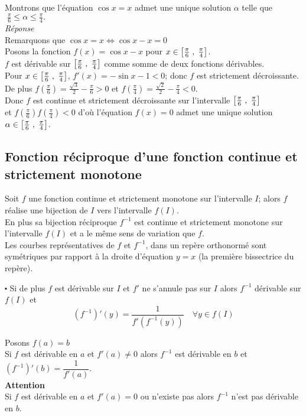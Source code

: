\begin{example}
Montrons  que l'équation $ \cos x= x $ admet une unique solution $ \alpha$ telle que    $\; \frac{\pi}{6} \leq \alpha \leq\frac{\pi}{4}.$ \\
\emph{Réponse}\\
Remarquons que  $ \cos x= x  \Leftrightarrow \cos x- x=0$\\
Posons la fonction $ f(x)= \cos x- x$ pour $ x\in \left[\frac{\pi}{6}\;,\; \frac{\pi}{4}\right] $.\\
$ f $ est dérivable sur $\left[\frac{\pi}{6}\;,\; \frac{\pi}{4}\right] $ comme somme de deux fonctions dérivables. \\
Pour $ x\in \left[\frac{\pi}{6}\;,\; \frac{\pi}{4}\right] $, $ f'(x)=-\sin x-1< 0 $; donc $ f $ est strictement décroissante.\\
De plus $ f(\frac{\pi}{6})=\frac{\sqrt{3}}{2} -\frac{\pi}{6 }> 0$  et $ f(\frac{\pi}{4})=\frac{\sqrt{2}}{2} -\frac{\pi}{4 }< 0$.\\
 Donc $ f $ est continue et strictement décroissante sur  l'intervalle $ \left[\frac{\pi}{6 }\;,\; \frac{\pi}{4}\right] $ \\et $ f(\frac{\pi}{6})f(\frac{\pi}{4}) < 0 $ 
d'où l'équation $ f(x)=0 $ admet une  unique  solution $ \alpha \in \left[\frac{\pi}{6}\;,\; \frac{\pi}{4}\right] $.


\end{example}

\subsection{Fonction réciproque d'une fonction continue et strictement monotone} 

\begin{theorem}
Soit $ f $ une fonction continue et strictement monotone  sur  l'intervalle $I$; alors $ f $ réalise une bijection de $ I $ vers l'intervalle $ f(I)$.\\
En plus sa bijection réciproque $ f^{-1} $ est continue et strictement monotone  sur  l'intervalle $f(I)$ et a le même sens de variation que $ f. $\\
Les courbes représentatives de $f $  et $f^{-1} $, dans un repère orthonormé sont symétriques par rapport  à la droite d'équation $ y=x $ (la première  bissectrice  du repère).
\end{theorem}



$ \centerdot $ Si de plus $ f $ est dérivable sur $ I $ et  $ f'$ ne s'annule pas sur  $ I $ alors $ f^{-1} $ dérivable sur $ f(I) $ et
 \[ (f^{-1})'(y)=\frac{1}{f'(f^{-1}(y))}\quad \forall y\in f(I)\]
\begin{remark}
Posons $ f(a)=b $ \\
Si $ f $ est dérivable en $ a $ et $ f'(a)\neq 0 $ alors $ f^{-1} $ est dérivable en $ b $ et $(f^{-1})'(b)=\dfrac{1}{f'(a)}.  $\\

\textbf{\color{red}Attention}\\
Si $ f $ est dérivable en $ a $ et  $ f'(a)= 0 $ ou n'existe pas alors $ f^{-1} $ n'est pas  dérivable en $ b. $
\end{remark}

